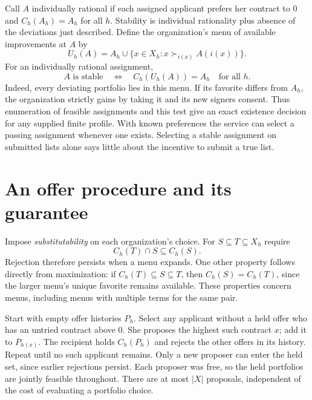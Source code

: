 \documentclass[11pt]{article}
\begin{document}
Call $A$ individually rational if each assigned applicant prefers her contract to $0$ and $C_h(A_h)=A_h$ for all $h$. Stability is individual rationality plus absence of the deviations just described. Define the organization's menu of available improvements at $A$ by
\[
 U_h(A)=A_h\cup\{x\in X_h:x\succ_{i(x)} A(i(x))\}.
\]
For an individually rational assignment,
\begin{equation}
 A\text{ is stable}\quad\Longleftrightarrow\quad C_h(U_h(A))=A_h\quad\text{for all }h. \label{eq:test}
\end{equation}
Indeed, every deviating portfolio lies in this menu. If its favorite differs from $A_h$, the organization strictly gains by taking it and its new signers consent. Thus enumeration of feasible assignments and this test give an exact existence decision for any supplied finite profile. With known preferences the service can select a passing assignment whenever one exists. Selecting a stable assignment on submitted lists alone says little about the incentive to submit a true list.

\section{An offer procedure and its guarantee}
Impose \emph{substitutability} on each organization's choice. For $S\subseteq T\subseteq X_h$ require
\[
 C_h(T)\cap S\subseteq C_h(S).
\]
Rejection therefore persists when a menu expands. One other property follows directly from maximization: if $C_h(T)\subseteq S\subseteq T$, then $C_h(S)=C_h(T)$, since the larger menu's unique favorite remains available. These properties concern menus, including menus with multiple terms for the same pair.

Start with empty offer histories $P_h$. Select any applicant without a held offer who has an untried contract above $0$. She proposes the highest such contract $x$; add it to $P_{h(x)}$. The recipient holds $C_h(P_h)$ and rejects the other offers in its history. Repeat until no such applicant remains. Only a new proposer can enter the held set, since earlier rejections persist. Each proposer was free, so the held portfolios are jointly feasible throughout. There are at most $|X|$ proposals, independent of the cost of evaluating a portfolio choice.
\end{document}
